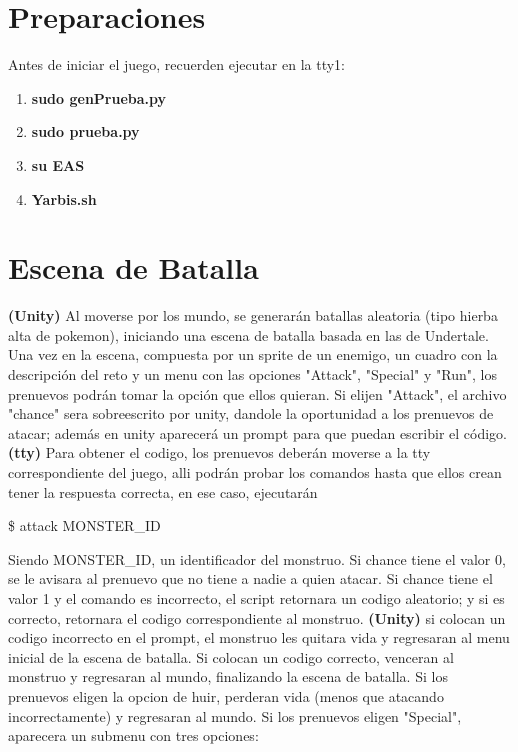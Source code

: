 \documentclass[a4paper,10pt]{article}
\begin{document}
\section{Preparaciones}
	\hspace{0.4cm} Antes de iniciar el juego, recuerden ejecutar en la tty1:
	\begin{enumerate}
		\item \textbf{sudo genPrueba.py}
		\item \textbf{sudo prueba.py}
		\item \textbf{su EAS}
		\item \textbf{Yarbis.sh}
		
	\end{enumerate}
	
	
\section{Escena de Batalla}
	\hspace{1cm}\textbf{(Unity)} Al moverse por los mundo, se generar\'an batallas aleatoria (tipo hierba alta de pokemon), iniciando una escena de batalla basada en las de Undertale. Una vez en la escena, compuesta por un sprite de un enemigo, un cuadro con la descripci\'on del reto y un menu con las opciones "Attack", "Special" y "Run", los prenuevos podr\'an tomar la opci\'on que ellos quieran. Si elijen "Attack", el archivo "chance" sera sobreescrito por unity, dandole la oportunidad a los prenuevos de atacar; adem\'as en unity aparecer\'a un prompt para que puedan escribir el c\'odigo. \textbf{(tty)} Para obtener el codigo, los prenuevos deber\'an moverse a la tty correspondiente del juego, alli podr\'an probar los comandos hasta que ellos crean tener la respuesta correcta, en ese caso, ejecutar\'an
	\begin{center}
		\$ attack MONSTER\_ID
	\end{center}	
	\hspace{0.4cm} Siendo MONSTER\_ID, un identificador del monstruo. Si chance tiene el valor 0, se le avisara al prenuevo que no tiene a nadie a quien atacar. Si chance tiene el valor 1 y el comando es incorrecto, el script retornara un codigo aleatorio; y si es correcto, retornara el codigo correspondiente al monstruo. \textbf{(Unity)} si colocan un codigo incorrecto en el prompt, el monstruo les quitara vida y regresaran al menu inicial de la escena de batalla. Si colocan un codigo correcto, venceran al monstruo y regresaran al mundo, finalizando la escena de batalla. Si los prenuevos eligen la opcion de huir, perderan vida (menos que atacando incorrectamente) y regresaran al mundo. Si los prenuevos eligen "Special", aparecera un submenu con tres opciones:
\end{document}
